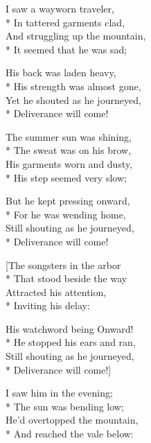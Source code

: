 
\contd
{}

\versemark
I saw a wayworn traveler,\\*
In tattered garments clad,\\
And struggling up the mountain,\\*
It seemed that he was sad;

His back was laden heavy,\\*
His strength was almost gone,\\
Yet he shouted as he journeyed,\\*
Deliverance will come!



\versemark
The summer sun was shining,\\*
The sweat was on his brow,\\
His garments worn and dusty,\\*
His step seemed very slow;

But he kept pressing onward,\\*
For he was wending home,\\
Still shouting as he journeyed,\\*
Deliverance will come!

[The songsters in the arbor\\*
That stood beside the way\\
Attracted his attention,\\*
Inviting his delay:

His watchword being Onward!\\*
He stopped his ears and ran,\\
Still shouting as he journeyed,\\*
Deliverance will come!]

\versemark
I saw him in the evening;\\*
The sun was bending low;\\
He’d overtopped the mountain,\\*
And reached the vale below:

